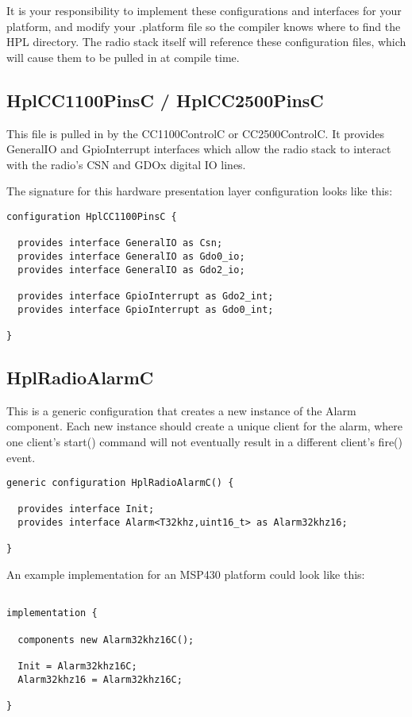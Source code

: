 \documentclass{article}
\begin{document}
It is your responsibility to implement these configurations and interfaces for your platform,
and modify your .platform file so the compiler knows where to find the HPL directory.
The radio stack itself will reference these configuration files, which will cause them
to be pulled in at compile time.

\subsection{HplCC1100PinsC / HplCC2500PinsC}
This file is pulled in by the CC1100ControlC or CC2500ControlC.  It provides 
GeneralIO and GpioInterrupt interfaces which allow the radio stack to interact
with the radio's CSN and GDOx digital IO lines.

The signature for this hardware presentation layer configuration looks like this:

\begin{verbatim}
configuration HplCC1100PinsC {

  provides interface GeneralIO as Csn;
  provides interface GeneralIO as Gdo0_io;
  provides interface GeneralIO as Gdo2_io;
  
  provides interface GpioInterrupt as Gdo2_int;
  provides interface GpioInterrupt as Gdo0_int;
  
}
\end{verbatim}


\subsection{HplRadioAlarmC}
This is a generic configuration that creates a new instance of the Alarm component.
Each new instance should create a unique client for the alarm, where one client's 
start() command will not eventually result in a different client's fire() event.


\begin{verbatim}
generic configuration HplRadioAlarmC() {

  provides interface Init;
  provides interface Alarm<T32khz,uint16_t> as Alarm32khz16;

}
\end{verbatim}

An example implementation for an MSP430 platform could look like this:

\begin{verbatim}

implementation {

  components new Alarm32khz16C();

  Init = Alarm32khz16C;
  Alarm32khz16 = Alarm32khz16C;
  
}
\end{verbatim}
\end{document}
